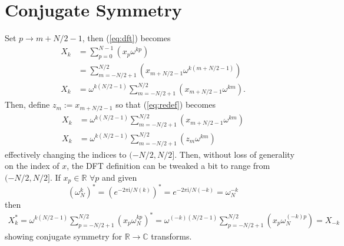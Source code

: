 \documentclass{article}
\begin{document}
\section {Conjugate Symmetry}
%
Set $p \rightarrow m + N/2 - 1$, then (\ref{eq:dft}) becomes
%
\begin {equation} \label {eq:redef}
\begin {aligned}
X_k &= \sum_{p = 0}^{N-1} (x_p \omega^{k p}) \\
    &= \sum_{m = -N/2 + 1}^{N/2} (x_{m + N/2 - 1} \omega^{k (m + N/2 - 1)}) \\
X_k &= \omega^{k (N/2 - 1)} \sum_{m = -N/2 + 1}^{N/2} (x_{m + N/2 - 1} \omega^{k m}).
\end {aligned}
\end {equation}
%
Then, define $z_m := x_{m + N/2 - 1}$ so that (\ref{eq:redef}) becomes
%
\begin {equation}
\begin {aligned}
X_k &= \omega^{k (N/2 - 1)} \sum_{m = -N/2 + 1}^{N/2} (x_{m + N/2 - 1} \omega^{k m}) \\
X_k &= \omega^{k (N/2 - 1)} \sum_{m = -N/2 + 1}^{N/2} (z_m \omega^{k m})
\end {aligned}
\end {equation}
%
effectively changing the indices to $(-N/2, N/2]$.
Then, without loss of generality on the index of $x$, the DFT definition can be tweaked a bit to range from $(-N/2, N/2]$.
If $x_p \in \mathbb {R}$ $\forall p$ and given
%
\begin {equation}
\left (\omega_N^{k} \right)^*
 = \left (e^{-2 \pi \mathrm {i} / N (k)} \right)^* 
 = e^{-2 \pi \mathrm {i} / N (-k)} 
 = \omega_{N}^{-k}
\end {equation}
%
then
%
\begin {equation}
\begin {aligned}
X_k^* = \omega^{k (N/2 - 1)} \sum_{p = -N/2+1}^{N/2} (x_p \omega_N^{k p})^*
      = \omega^{(-k) (N/2 - 1)} \sum_{p = -N/2+1}^{N/2} (x_p \omega_N^{(-k) p})
      = X_{-k}
\end {aligned}
\end {equation}
%
showing conjugate symmetry for $\mathbb{R} \rightarrow \mathbb{C}$ transforms.
%
\end{document}

